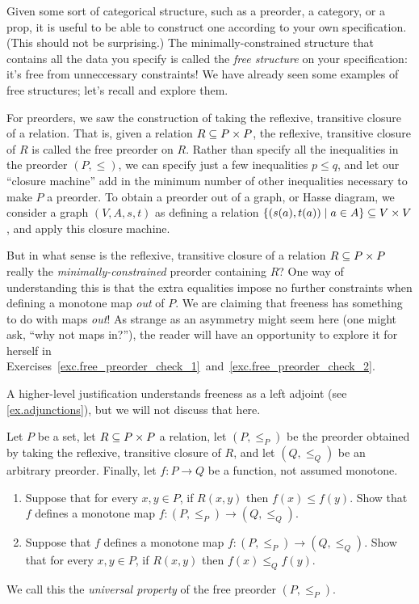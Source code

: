 \documentclass[7Sketches]{subfiles}
\begin{document}
Given some sort of categorical structure, such as a preorder, a category, or a prop,
it is useful to be able to construct one according to your own specification.
(This should not be surprising.) The minimally-constrained structure that
contains all the data you specify is called the \emph{free structure} on your
specification: it's free from unneccessary constraints! We have already seen
some examples of free structures; let's recall and explore them.

\begin{example}%
%
%
For preorders, we saw the construction of taking the reflexive, transitive closure
of a relation. That is, given a relation $R\ss P\times P$, the reflexive,
transitive closure of $R$ is called the free preorder on $R$. Rather than
specify all the inequalities in the preorder $(P,\leq)$, we can specify just a few
inequalities $p \le q$, and let our ``closure machine'' add in the minimum
number of other inequalities necessary to make $P$ a preorder. To obtain a preorder
out of a graph, or Hasse diagram, we consider a
graph $(V,A,s,t)$ as defining a relation $\{(s(a),t(a)) \mid a \in A\} \ss V
\times V$, and apply this closure machine.

But in what sense is the reflexive, transitive closure of a relation $R\ss P\times P$ really the \emph{minimally-constrained} preorder containing $R$? One way of understanding this is that the extra equalities impose
no further constraints when defining a monotone map \emph{out} of $P$. We are
claiming that freeness has something to do with maps \emph{out}! As strange as
an asymmetry might seem here (one might ask, ``why not maps in?''), the reader
will have an opportunity to explore it for herself in Exercises~\ref{exc.free_preorder_check_1}~and~\ref{exc.free_preorder_check_2}.%

A higher-level justification understands freeness as a left adjoint (see
\cref{ex.adjunctions}), but we will not discuss that here.
\end{example}

\begin{exercise}%
\label{exc.free_preorder_check_1}
Let $P$ be a set, let $R\ss P \times P$ a relation, let $(P,\leq_P)$ be the preorder
obtained by taking the reflexive, transitive closure of $R$, and let $(Q,\leq_Q)$ be an arbitrary preorder. Finally, let $f\colon P\to Q$ be a function, not assumed monotone.
\begin{enumerate}
	\item Suppose that for every $x,y\in P$, if $R(x,y)$ then $f(x)\leq f(y)$. Show that $f$ defines a monotone map $f\colon (P,\leq_P)\to (Q,\leq_Q)$.
	\item Suppose that $f$ defines a monotone map $f\colon (P,\leq_P)\to (Q,\leq_Q)$. Show that for every $x,y\in P$, if $R(x,y)$ then $f(x)\leq_Q f(y)$.
\end{enumerate}
We call this the \emph{universal property} of the free preorder $(P,\leq_P)$.%
\end{exercise}
\end{document}
